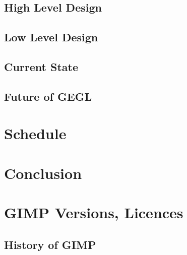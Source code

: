 \documentclass{report}
\begin{document}
\section{High Level Design}
\label{sec:High_Level_Design}


\section{Low Level Design}
\label{sec:Low_Level_Design}


\section{Current State}
\label{sec:Current_State}


\section{Future of GEGL}
\label{sec:Future_of_GEGL}



\chapter{Schedule}
\label{ch:Schedule}



\chapter{Conclusion}
\label{ch:Conclusion}



\appendix


\chapter{GIMP Versions, Licences}
\label{ch:GIMP_Versions_Licences}

\section{History of GIMP}
\label{sec:History_of_GIMP} 

\end{document}
